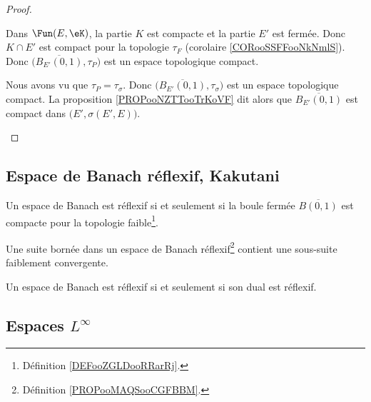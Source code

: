 \begin{proof}
\begin{subproof}
		\spitem[Conclusions]
		Dans \( \Fun(E,\eK)\), la partie \( K\) est compacte et la partie \( E'\) est fermée. Donc \( K\cap E'\) est compact pour la topologie \( \tau_F\) (corolaire \ref{CORooSSFFooNkNmlS}). Donc \( \big( \overline{B_{E'}(0,1)},\tau_P \big)\) est un espace topologique compact.

		Nous avons vu que \( \tau_P=\tau_{\sigma}\). Donc \( \big( \overline{B_{E'}(0,1)},\tau_{\sigma} \big)\) est un espace topologique compact. La proposition \ref{PROPooNZTTooTrKoVF} dit alors que \( \overline{B_{E'}(0,1)}\) est compact dans \( \big( E',\sigma(E',E) \big)\).
	\end{subproof}
\end{proof}


\subsection{Espace de Banach réflexif, Kakutani}

\begin{theorem}       \label{THOooTFIHooPQjVAr}
	Un espace de Banach est réflexif si et seulement si la boule fermée \( \overline{ B(0,1) }\) est compacte pour la topologie faible\footnote{Définition \ref{DEFooZGLDooRRarRj}.}.
\end{theorem}

\begin{proposition}       \label{PROPooPVVYooMZjQSq}
	Une suite bornée dans un espace de Banach réflexif\footnote{Définition \ref{PROPooMAQSooCGFBBM}.} contient une sous-suite faiblement convergente.
\end{proposition}

\begin{proposition}       \label{PROPooBBNBooGcXDRH}
	Un espace de Banach est réflexif si et seulement si son dual est réflexif.
\end{proposition}

\subsection{Espaces \texorpdfstring{\(  L^{\infty}\)}{Linfinity}}

